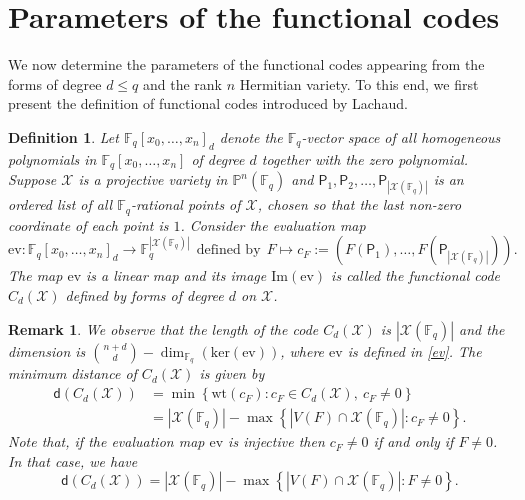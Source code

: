\documentclass[10pt,a4paper,oneside]{amsproc}
\newtheorem{definition}[theorem]{Definition}
\newtheorem{remark}[theorem]{Remark}
\newcommand{\wt}{\mathrm{wt}}
\newcommand{\Fq}{\mathbb{F}_q}
\def\Fq{{\mathbb F}_q}
\def\PP{{\mathbb P}}
\newcommand{\X}{\mathcal{X}}
\newcommand{\p}{\mathsf{P}}
\begin{document}
\section{ Parameters of the functional codes}\label{parameters}
We now determine the parameters of the functional codes appearing from the forms of degree $d\leq q$ and the rank $n$ Hermitian variety. To this end, we first present the definition of functional codes introduced by Lachaud.
\begin{definition}\cite[Definition 5.4]{L}\label{functional code}
\normalfont Let $\Fq[x_0,\dots,x_n]_d$ denote the $\Fq$-vector space of all homogeneous polynomials in $\Fq[x_0,\dots,x_n]$ of degree $d$ together with the zero polynomial. Suppose $\X$ is a projective variety in $\PP^n(\Fq)$ and $\p_1,\p_2,\dots,\p_{|\X(\Fq)|}$ is an ordered list of all $\Fq$-rational points of $\X$, chosen so that the last non-zero coordinate of each point is $1$. Consider the evaluation map
\begin{equation}\label{ev}
\mathrm{ev}:\Fq[x_0,\dots,x_n]_d \to \Fq^{|\X(\Fq)|} \ \ \text{defined by} \ \ F\mapsto c_F:=\left(F\left(\p_1\right),\dots,F\left(\p_{|\X(\Fq)|}\right)\right).
\end{equation}
The map $\mathrm{ev}$ is a linear map and its image $\mathrm{Im}\left(\mathrm{ev}\right)$ is called the \textit{functional code $C_d(\X)$ defined by forms of degree $d$ on $\X$}.
\end{definition} 

\begin{remark}\label{re: parameter}
 \normalfont We observe that the \textit{length} of the code $C_d(\X)$ is $|\X(\Fq)|$ and the \textit{dimension} is  $\binom{n+d}{d}-\dim_{\Fq}\left(\mathrm{ker}\left(\mathrm{ev}\right)\right)$, where $\mathrm{ev}$ is defined in \eqref{ev}. The \textit{minimum distance} of $C_d(\X)$ is given by
 \begin{align*}
     \mathsf{d}(C_d(\X)) &=\min\left\{\wt(c_F): c_F\in C_d(\X),\ c_F\neq 0\right\}\\
                        &=|\X(\Fq)|-\max\left\{|V(F)\cap \X(\Fq)|: c_F\neq 0\right\}.
\end{align*}
 Note that, if the evaluation map $\mathrm{ev}$ is \textit{injective} then $c_F\neq 0$ if and only if $F\neq 0$. In that case, we have 
 $$\mathsf{d}(C_d(\X))=|\X(\Fq)|-\max\left\{|V(F)\cap \X(\Fq)|: F\neq 0\right\}.$$
\end{remark}
\end{document}
